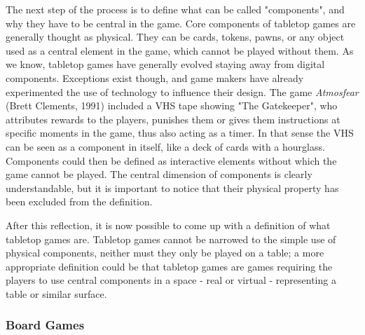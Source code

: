 The next step of the process is to define what can be called "components", and why they have to be central in the game. Core components of tabletop games are generally thought as physical. They can be cards, tokens, pawns, or any object used as a central element in the game, which cannot be played without them.  As we know, tabletop games have generally evolved staying away from digital components. Exceptions exist though, and game makers have already experimented the use of technology to influence their design. The game \textit{Atmosfear} (Brett Clements, 1991) included a VHS tape showing "The Gatekeeper", who attributes rewards to the players, punishes them or gives them instructions at specific moments in the game, thus also acting as a timer. In that sense the VHS can be seen as a component in itself, like a deck of cards with a hourglass. 
Components could then be defined as interactive elements without which the game cannot be played. The central dimension of components is clearly understandable, but it is important to notice that their physical property has been excluded from the definition.


After this reflection, it is now possible to come up with a definition of what tabletop games are. Tabletop games cannot be narrowed to the simple use of physical components, neither must they only be played on a table; a more appropriate definition could be that tabletop games are games requiring the players to use central components in a space - real or virtual - representing a table or similar surface.


\subsubsection{Board Games}

